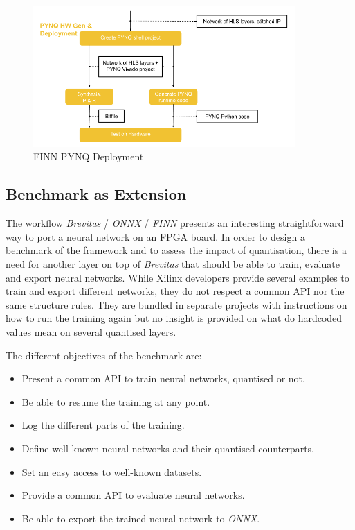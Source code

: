 \begin{figure}[htbp]
	\centering
		\includegraphics[width=10cm]{Figures/FINNPYNQ.png}
	\caption[FINN PYNQ Deployment]{FINN PYNQ Deployment}
	\label{fig:FINNPYNQ}
\end{figure}


\subsection{Benchmark as Extension}

The workflow \emph{Brevitas} / \emph{ONNX} / \emph{FINN} presents an interesting straightforward way to port a neural network on an FPGA board. In order to design a benchmark of the framework and to assess the impact of quantisation, there is a need for another layer on top of \emph{Brevitas} that should be able to train, evaluate and export neural networks. While Xilinx developers provide several examples to train and export different networks, they do not respect a common API nor the same structure rules. They are bundled in separate projects with instructions on how to run the training again but no insight is provided on what do hardcoded values mean on several quantised layers.

The different objectives of the benchmark are:
\begin{itemize}
  \item Present a common API to train neural networks, quantised or not.
  \item Be able to resume the training at any point.
  \item Log the different parts of the training.
  \item Define well-known neural networks and their quantised counterparts.
  \item Set an easy access to well-known datasets.
  \item Provide a common API to evaluate neural networks.
  \item Be able to export the trained neural network to \emph{ONNX}.
\end{itemize}


